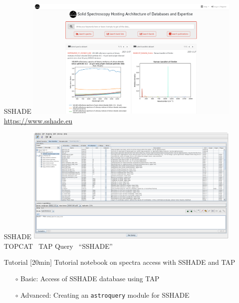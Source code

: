 \begin{frame}[t]{SSHADE}
  \includegraphics[width=0.8\textwidth]{gfx/demo_sshade}
  \url{https://www.sshade.eu}
\end{frame}

\begin{frame}[t]{SSHADE}
  \includegraphics[width=0.8\textwidth]{gfx/demo_tap}\\
  TOPCAT \textrightarrow~TAP Query \textrightarrow~``SSHADE''
\end{frame}

\begin{frame}[t]{Tutorial}
  [20min] Tutorial notebook on spectra access with SSHADE and TAP
  \bigskip
  \begin{itemize}
    \item[$\circ$] Basic: Access of SSHADE database using TAP
    \item[$\circ$] Advanced: Creating an \texttt{astroquery} module for SSHADE
  \end{itemize}
\end{frame}
